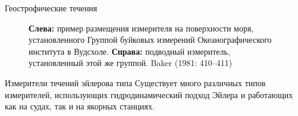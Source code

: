 \begin{chapter}{Геострофические течения}
\begin{figure}[b!]
\caption{\textbf{Слева:} пример размещения измерителя на поверхности
моря, установленного Группой буйковых измерений Океанографического
института в Вудсхоле. \textbf{Справа:} подводный измеритель,
установленный этой же группой. Baker (1981: 410--411)}
\label{fig:moorings}
\end{figure}
%

\begin{section}{Измерители течений эйлерова типа}
Существует много различных типов измерителей, использующих
гидродинамический подход Эйлера и работающих как на судах, так и на
якорных станциях.
%


\end{section}
\end{chapter}
